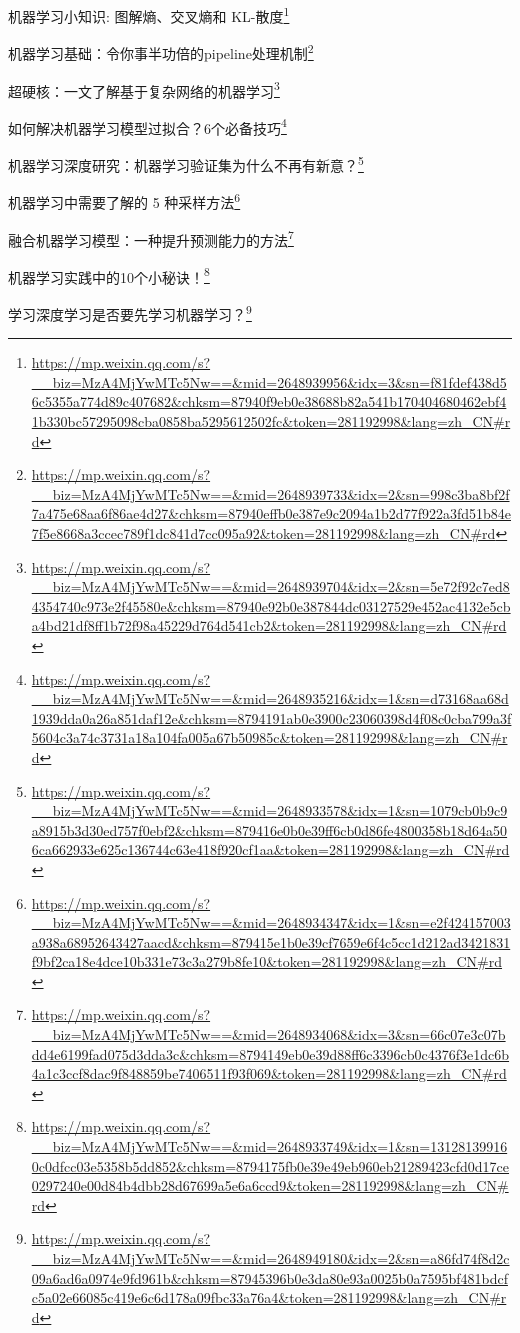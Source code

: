 \documentclass[]{ctexbook}
\renewcommand{\href}[2]{#2\footnote{\url{#1}}}
\begin{document}
\href{https://mp.weixin.qq.com/s?__biz=MzA4MjYwMTc5Nw==\&mid=2648939956\&idx=3\&sn=f81fdef438d56c5355a774d89c407682\&chksm=87940f9eb0e38688b82a541b170404680462ebf41b330bc57295098cba0858ba5295612502fc\&token=281192998\&lang=zh_CN\#rd}{机器学习小知识: 图解熵、交叉熵和 KL-散度}

\href{https://mp.weixin.qq.com/s?__biz=MzA4MjYwMTc5Nw==\&mid=2648939733\&idx=2\&sn=998c3ba8bf2f7a475e68aa6f86ae4d27\&chksm=87940effb0e387e9c2094a1b2d77f922a3fd51b84e7f5e8668a3ccec789f1dc841d7cc095a92\&token=281192998\&lang=zh_CN\#rd}{机器学习基础：令你事半功倍的pipeline处理机制}

\href{https://mp.weixin.qq.com/s?__biz=MzA4MjYwMTc5Nw==\&mid=2648939704\&idx=2\&sn=5e72f92c7ed84354740c973e2f45580e\&chksm=87940e92b0e387844dc03127529e452ac4132e5cba4bd21df8ff1b72f98a45229d764d541cb2\&token=281192998\&lang=zh_CN\#rd}{超硬核：一文了解基于复杂网络的机器学习}

\href{https://mp.weixin.qq.com/s?__biz=MzA4MjYwMTc5Nw==\&mid=2648935216\&idx=1\&sn=d73168aa68d1939dda0a26a851daf12e\&chksm=8794191ab0e3900c23060398d4f08c0cba799a3f5604c3a74c3731a18a104fa005a67b50985c\&token=281192998\&lang=zh_CN\#rd}{如何解决机器学习模型过拟合？6个必备技巧}

\href{https://mp.weixin.qq.com/s?__biz=MzA4MjYwMTc5Nw==\&mid=2648933578\&idx=1\&sn=1079cb0b9c9a8915b3d30ed757f0ebf2\&chksm=879416e0b0e39ff6cb0d86fe4800358b18d64a506ca662933e625c136744c63e418f920cf1aa\&token=281192998\&lang=zh_CN\#rd}{机器学习深度研究：机器学习验证集为什么不再有新意？}

\href{https://mp.weixin.qq.com/s?__biz=MzA4MjYwMTc5Nw==\&mid=2648934347\&idx=1\&sn=e2f424157003a938a68952643427aacd\&chksm=879415e1b0e39cf7659e6f4c5cc1d212ad3421831f9bf2ca18e4dce10b331e73c3a279b8fe10\&token=281192998\&lang=zh_CN\#rd}{机器学习中需要了解的 5 种采样方法}

\href{https://mp.weixin.qq.com/s?__biz=MzA4MjYwMTc5Nw==\&mid=2648934068\&idx=3\&sn=66c07e3c07bdd4e6199fad075d3dda3c\&chksm=8794149eb0e39d88ff6c3396cb0c4376f3e1dc6b4a1c3ccf8dac9f848859be7406511f93f069\&token=281192998\&lang=zh_CN\#rd}{融合机器学习模型：一种提升预测能力的方法}

\href{https://mp.weixin.qq.com/s?__biz=MzA4MjYwMTc5Nw==\&mid=2648933749\&idx=1\&sn=131281399160c0dfcc03e5358b5dd852\&chksm=8794175fb0e39e49eb960eb21289423cfd0d17ce0297240e00d84b4dbb28d67699a5e6a6ccd9\&token=281192998\&lang=zh_CN\#rd}{机器学习实践中的10个小秘诀！}

\href{https://mp.weixin.qq.com/s?__biz=MzA4MjYwMTc5Nw==\&mid=2648949180\&idx=2\&sn=a86fd74f8d2c09a6ad6a0974e9fd961b\&chksm=87945396b0e3da80e93a0025b0a7595bf481bdcfc5a02e66085c419e6c6d178a09fbc33a76a4\&token=281192998\&lang=zh_CN\#rd}{学习深度学习是否要先学习机器学习？}
\end{document}
